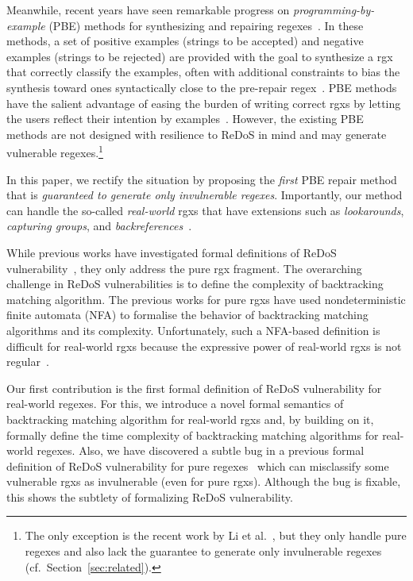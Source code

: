 \documentclass[conference]{IEEEtran}
\begin{document}
Meanwhile, recent years have seen remarkable progress on {\em programming-by-example} (PBE) methods for synthesizing and repairing regexes~\cite{Alquezar94incrementalgrammatical,10.1145/3093335.2993244, 6994453, 7374717, 10.1145/3360565, DBLP:journals/corr/abs-1908-03316, FlashRegex}.
In these methods, a set of positive examples (strings to be accepted) and negative examples (strings to be rejected) are provided with the goal to synthesize a {rgx} that correctly classify the examples, often with additional constraints to bias the synthesis toward ones syntactically close to the pre-repair regex~\cite{10.1145/3360565, FlashRegex}.
PBE methods have the salient advantage of easing the burden of writing correct {rgxs} by letting the users reflect their intention by examples~\cite{10.1145/3093335.2993244, 6994453, 10.1145/3360565, FlashRegex}.
However, the existing PBE methods are not designed with resilience to ReDoS in mind and may generate vulnerable regexes.\footnote{\label{foot:flashregex} The only exception is the recent work by Li et al.~\cite{FlashRegex}, but they only handle pure regexes and also lack the guarantee to generate only invulnerable regexes (cf.~Section~\ref{sec:related}).}

In this paper, we rectify the situation by proposing the {\em first} PBE repair method that is {\em guaranteed to generate only invulnerable regexes}.
Importantly, our method can handle the so-called {\em real-world} {rgxs} that have extensions such as {\em lookarounds}, {\em capturing groups}, and {\em backreferences}~\cite{masteringregex}.  

While previous works have investigated formal definitions of ReDoS vulnerability~\cite{10.1007/978-3-319-40946-7_27,SatoshiSugiyama2014,10.1007/978-3-662-54580-5_1}, they only address the pure {rgx} fragment.  The overarching challenge in ReDoS vulnerabilities is to define the complexity of backtracking matching algorithm.  The previous works for pure {rgxs} have used nondeterministic finite automata (NFA) to formalise the behavior of backtracking matching algorithms and its complexity.  Unfortunately, such a NFA-based definition is difficult for real-world {rgxs} because the expressive power of real-world {rgxs} is not regular~\cite{backreferenceisundeci}.  






Our first contribution is the first formal definition of ReDoS vulnerability for real-world regexes.  For this, we introduce a novel formal semantics of backtracking matching algorithm for real-world {rgxs} and, by building on it, formally define the time complexity of backtracking matching algorithms for real-world regexes.  Also, we have discovered a subtle bug in a previous formal definition of ReDoS vulnerability for pure regexes~\cite{10.1007/978-3-662-54580-5_1} which can misclassify some vulnerable {rgxs} as invulnerable (even for pure {rgxs}).  Although the bug is fixable, this shows the subtlety of formalizing ReDoS vulnerability.
\end{document}
